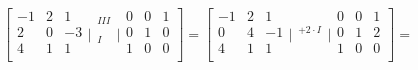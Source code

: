 $$
  \left[
  \begin{array}{rrr}
   -1 & 2 & 1 \\
    2 & 0 & -3 \\
    4 & 1 &  1 \\
  \end{array} \Bigg|
  \begin{array}{ccc}
    _{III} \\
    _{} \\
    _{I} \\
  \end{array}
  \Bigg| \begin{array}{rrr}
    0 & 0 & 1 \\
    0 & 1 & 0 \\
    1 & 0 & 0 \\
  \end{array} \right]= \left[
  \begin{array}{rrr}
   -1 & 2 & 1 \\
    0 & 4 & -1 \\
    4 & 1 &  1 \\
  \end{array} \Bigg|
  \begin{array}{ccc}
    _{} \\
    _{+2 \cdot I} \\
    _{} \\
  \end{array}
  \Bigg| \begin{array}{rrr}
    0 & 0 & 1 \\
    0 & 1 & 2 \\
    1 & 0 & 0 \\
  \end{array} \right] =
$$

